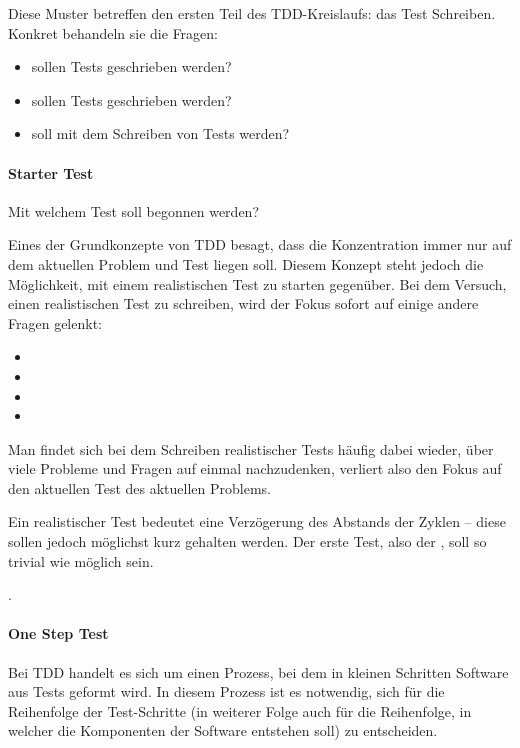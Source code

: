 Diese Muster betreffen den ersten Teil des TDD-Kreislaufs: das Test Schreiben.
Konkret behandeln sie die Fragen:
\begin{itemize}
  \item {} sollen Tests geschrieben werden?
  \item {} sollen Tests geschrieben werden?
  \item {} soll mit dem Schreiben von Tests  werden?
\end{itemize}

\paragraph{Starter Test}
Mit welchem Test soll begonnen werden?

Eines der Grundkonzepte von TDD besagt, dass die Konzentration immer nur auf dem aktuellen Problem und Test liegen soll. Diesem Konzept steht jedoch die Möglichkeit, mit einem realistischen Test zu starten gegenüber. Bei dem Versuch, einen realistischen Test zu schreiben, wird der Fokus sofort auf einige andere Fragen gelenkt: 
\begin{itemize}
  \item {}
  \item {}
  \item {}
  \item {}
\end{itemize}
Man findet sich bei dem Schreiben realistischer Tests häufig dabei wieder, über viele Probleme und Fragen auf einmal nachzudenken, verliert also den Fokus auf den aktuellen Test des aktuellen Problems.

Ein realistischer Test bedeutet eine Verzögerung des Abstands der  Zyklen -- diese sollen jedoch möglichst kurz gehalten werden. Der erste Test, also der , soll so trivial wie möglich sein.

 \autocite[134]{Beck:2003}.

\paragraph{One Step Test}
Bei TDD handelt es sich um einen Prozess, bei dem in kleinen Schritten Software aus Tests geformt wird. In diesem Prozess ist es notwendig, sich für die Reihenfolge der Test-Schritte (in weiterer Folge auch für die Reihenfolge, in welcher die Komponenten der Software entstehen soll) zu entscheiden.

